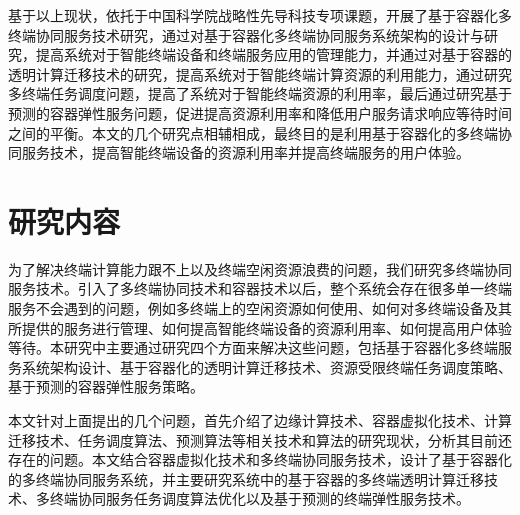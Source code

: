 基于以上现状，依托于中国科学院战略性先导科技专项课题，开展了基于容器化多终端协同服务技术研究，通过对基于容器化多终端协同服务系统架构的设计与研究，提高系统对于智能终端设备和终端服务应用的管理能力，并通过对基于容器的透明计算迁移技术的研究，提高系统对于智能终端计算资源的利用能力，通过研究多终端任务调度问题，提高了系统对于智能终端资源的利用率，最后通过研究基于预测的容器弹性服务问题，促进提高资源利用率和降低用户服务请求响应等待时间之间的平衡。本文的几个研究点相辅相成，最终目的是利用基于容器化的多终端协同服务技术，提高智能终端设备的资源利用率并提高终端服务的用户体验。

\section{研究内容}
为了解决终端计算能力跟不上以及终端空闲资源浪费的问题，我们研究多终端协同服务技术。引入了多终端协同技术和容器技术以后，整个系统会存在很多单一终端服务不会遇到的问题，例如多终端上的空闲资源如何使用、如何对多终端设备及其所提供的服务进行管理、如何提高智能终端设备的资源利用率、如何提高用户体验等待。本研究中主要通过研究四个方面来解决这些问题，包括基于容器化多终端服务系统架构设计、基于容器化的透明计算迁移技术、资源受限终端任务调度策略、基于预测的容器弹性服务策略。

本文针对上面提出的几个问题，首先介绍了边缘计算技术、容器虚拟化技术、计算迁移技术、任务调度算法、预测算法等相关技术和算法的研究现状，分析其目前还存在的问题。本文结合容器虚拟化技术和多终端协同服务技术，设计了基于容器化的多终端协同服务系统，并主要研究系统中的基于容器的多终端透明计算迁移技术、多终端协同服务任务调度算法优化以及基于预测的终端弹性服务技术。


